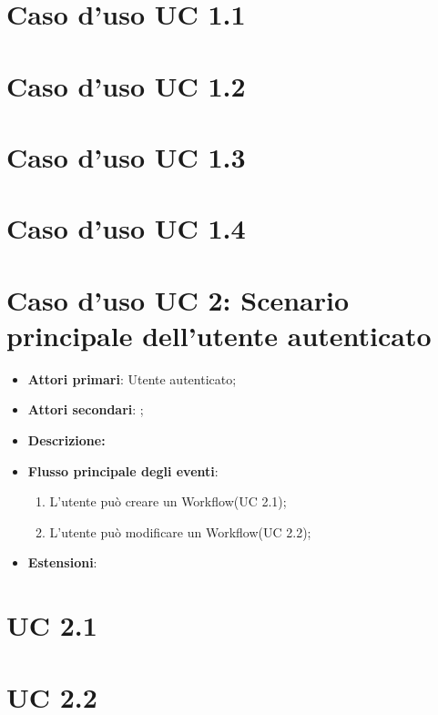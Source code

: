\section{Caso d'uso UC 1.1}

\section{Caso d'uso UC 1.2}

\section{Caso d'uso UC 1.3}

\section{Caso d'uso UC 1.4}

\section{Caso d'uso UC 2: Scenario principale dell'utente autenticato}
\begin{itemize}
	\item \textbf{Attori primari}: Utente autenticato;
	\item \textbf{Attori secondari}: ;
	\item \textbf{Descrizione:}
	\item \textbf{Flusso principale degli eventi}:
	\begin{enumerate}
		\item L'utente può creare un Workflow(UC 2.1);
		\item L'utente può modificare un Workflow(UC 2.2);
	\end{enumerate}
	\item \textbf{Estensioni}:

\end{itemize}

\section{UC 2.1}

\section{UC 2.2}

